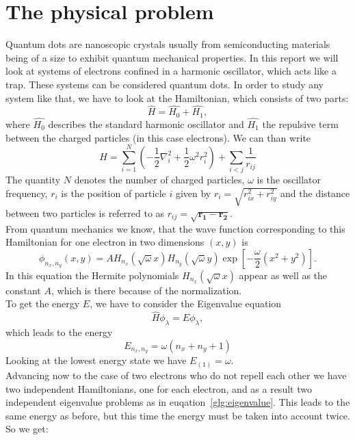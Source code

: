 \section{The physical problem}\label{sec:problem}
Quantum dots are nanoscopic crystals usually from semiconducting materials being of a size to exhibit quantum mechanical properties. In this report we will look at systems of electrons confined in a harmonic oscillator, which acts like a trap. These systems can be considered quantum dots. In order to study any system like that, we have to look at the Hamiltonian, which consists of two parts:
\begin{equation}
\hat{H} = \hat{H_0} + \hat{H_1},
\end{equation}
where $\hat{H_0}$ describes the standard harmonic oscillator and $\hat{H_1}$ the repulsive term between the charged particles (in this case electrons). We can than write
\begin{equation}
\hat{H} = \sum_{i=1}^N \left( -\frac{1}{2} \nabla_i^2 + \frac{1}{2} \omega^2 r_i^2 \right) + \sum_{i<j} \frac{1}{r_{ij}}
\end{equation}
The quantity $N$ denotes the number of charged particles, $\omega$ is the oscillator frequency, $r_i$ is the position of particle $i$ given by $r_i = \sqrt{r_{ix}^2 + r_{iy}^2}$ and the distance between two particles is referred to as $r_{ij} = \sqrt{\mathbf{r_1}- \mathbf{r_2}}$.\\
From quantum mechanics we know, that the wave function corresponding to this Hamiltonian for one electron in two dimensions $(x,y)$ is
\begin{equation}\label{glg:wavefunc1}
\phi_{n_x,n_y}(x,y) = A H_{n_x} (\sqrt{\omega} x) H_{n_y} (\sqrt{\omega} y) \exp\left[-\frac{\omega}{2} (x^2+y^2)\right].
\end{equation}
In this equation the Hermite polynomials $H_{n_x} (\sqrt{\omega} x)$ appear as well as the constant $A$, which is there because of the normalization.\\
To get the energy $E$, we have to consider the Eigenvalue equation
\begin{equation}\label{glg:eigenvalue}
\hat{H} \phi_\lambda = E \phi_\lambda,
\end{equation}
which leads to the energy
\begin{equation}
E_{n_x,n_y} = \omega(n_x + n_y +1)
\end{equation}
Looking at the lowest energy state we have $E_{(1)}=\omega$.\\
Advancing now to the case of two electrons who do not repell each other we have two independent Hamiltonians, one for each electron, and as a result two independent eigenvalue problems as in euqation~\ref{glg:eigenvalue}. This leads to the same energy as before, but this time the energy must be taken into account twice. So we get:
